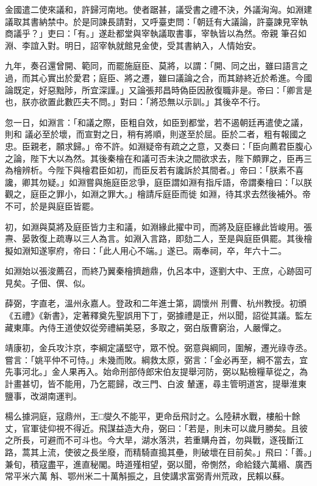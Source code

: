 \begin{pinyinscope}
 金國遣二使來議和，許歸河南地。使者踞甚，議受書之禮不決，外議洶洶。如淵建議取其書納禁中。於是同諫長請對，又呼臺吏問：「朝廷有大議論，許臺諫見宰執商議乎？」吏曰：「有。」遂赴都堂與宰執議取書事，宰執皆以為然。帝親
 筆召如淵、李誼入對。明日，詔宰執就館見金使，受其書納入，人情始安。



 九年，奏召還曾開、範同，而罷施庭臣、莫將，以謂：「開、同之出，雖曰語言之過，而其心實出於愛君；庭臣、將之遷，雖曰議論之合，而其跡終近於希進。今國論既定，好惡黜陟，所宜深謹。」又論張邦昌時偽臣因赦復職非是。帝曰：「卿言是也，朕亦欲置此數匹夫不問。」對曰：「將恐無以示訓。」其後卒不行。



 忽一日，如淵言：「和議之際，臣粗自效，如臣到都堂，若不遏朝廷再遣使之議，則和
 議必至於壞，而宣對之日，稍有將順，則遂至於屈。臣於二者，粗有報國之忠。臣親老，願求歸。」帝不許。如淵疑帝有疏之之意，又奏曰：「臣向薦君臣腹心之論，陛下大以為然。其後秦檜在和議可否未決之間欲求去，陛下頗罪之，臣再三為檜辨析。今陛下與檜君臣如初，而臣反若有讒訴於其間者。」帝曰：「朕素不喜讒，卿其勿疑。」如淵嘗與施庭臣忿爭，庭臣謂如淵有指斥語，帝謂秦檜曰：「以朕觀之，庭臣之罪小，如淵之罪大。」檜請斥庭臣而徙
 如淵，待其求去然後補外。帝不可，於是與庭臣皆罷。



 初，如淵與莫將及庭臣皆力主和議，如淵緣此擢中司，而將及庭臣緣此皆峻用。張燾、晏敦復上疏專以三人為言。如淵入言路，即劾二人，至是與庭臣俱罷。其後檜擬如淵知遂寧府，帝曰：「此人用心不端。」遂已。兩奉祠，卒，年六十二。



 如淵始以張浚薦召，而終乃翼秦檜擠趙鼎，仇呂本中，逐劉大中、王庶，心跡固可見矣。子佃、僎、似。



 薛弼，字直老，溫州永嘉人。登政和二年進士第，調懷州
 刑曹、杭州教授。初頒《五禮》《新書》，定著釋奠先聖誤用下丁，弼據禮是正，州以聞，詔從其議。監左藏東庫。內侍王道使奴從旁禮絹美惡，多取之，弼白版曹窮治，人嚴憚之。



 靖康初，金兵攻汴京，李綱定議堅守，眾不悅。弼意與綱同，圍解，遷光祿寺丞。嘗言：「姚平仲不可恃。」未幾而敗。綱救太原，弼言：「金必再至，綱不當去，宜先事河北。」金人果再入。始命刑部侍郎宋伯友提舉河防，弼以點檢糧草從之，為計畫甚切，皆不能用，乃乞罷歸，改三門、白波
 輦運，尋主管明道宮，提舉淮東鹽事，改湖南運判。



 楊么據洞庭，寇鼎州，王□燮久不能平，更命岳飛討之。么陸耕水戰，樓船十餘丈，官軍徒仰視不得近。飛謀益造大舟，弼曰：「若是，則未可以歲月勝矣。且彼之所長，可避而不可斗也。今大旱，湖水落洪，若重購舟首，勿與戰，逐筏斷江路，蒿其上流，使彼之長坐廢，而精騎直搗其壘，則破壞在目前矣。」飛曰：「善。」兼旬，積寇盡平，進直秘閣。時道殣相望，弼以聞，帝惻然，命給錢六萬緡、廣西常平米六萬
 斛、鄂州米二十萬斛振之，且使講求富弼青州荒政，民賴以蘇。




\end{pinyinscope}
